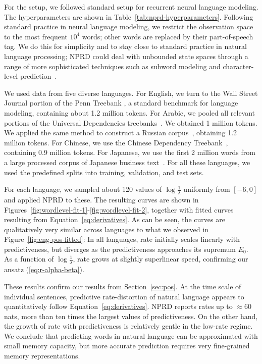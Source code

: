 \documentclass[entropy,article,submit,moreauthors,pdftex,10pt,a4paper]{Definitions/mdpi}
\begin{document}
For the setup, we followed standard setup for recurrent neural language modeling.
The hyperparameters are shown in Table~\ref{tab:nprd-hyperparameters}.
Following standard practice in neural language modeling, we restrict the observation space to the most frequent $10^4$ words; other words are replaced by their part-of-speech tag.
We do this for simplicity and to stay close to standard practice in natural language processing; NPRD could deal with unbounded state spaces through a range of more sophisticated techniques such as subword modeling and character-level prediction~\citep{kim2016character,luong2016achieving}.


We used data from five diverse languages.
For English, we turn to the Wall Street Journal portion of the Penn Treebank \citep{marcus-building-1993}, a standard benchmark for language modeling, containing about 1.2 million tokens.
For Arabic, we pooled all relevant portions of the Universal Dependencies treebanks~\citep{nivre-universal-2016,maamouri2004penn,hajic2004prague}. We obtained 1 million tokens.
We applied the same method to construct a Russian corpus~\citep{syntagrus}, obtaining 1.2 million tokens.
For Chinese, we use the Chinese Dependency Treebank~\citep{che2012chinese}, containing 0.9 million tokens.
For Japanese, we use the first 2 million words from a large processed corpus of Japanese business text~\citep{graff1995japanese}.
For all these languages, we used the predefined splits into training, validation, and test sets.

For each language, we sampled about 120 values of $\log \frac{1}{\lambda}$ uniformly from $[-6, 0]$ and applied NPRD to these.
The resulting curves are shown in Figures~\ref{fig:wordlevel-fit-1}-\ref{fig:wordlevel-fit-2}, together with fitted curves resulting from Equation~\ref{eq:derivatives}.
As can be seen, the curves are qualitatively very similar across languages to what we observed in Figure~\ref{fig:eng-pos-fitted}:
In all languages, rate initially scales linearly with predictiveness, but diverges as the predictiveness approaches its supremum $E_0$.
As a function of $\log \frac{1}{\lambda}$, rate grows at slightly superlinear speed, confirming our ansatz (\ref{eq:r-alpha-beta}).

These results confirm our results from Section~\ref{sec:pos}.
At the time scale of individual sentences, predictive rate-distortion of natural language appears to quantitatively follow Equation~\ref{eq:derivatives}.
NPRD reports rates up to $\approx 60$ nats, more than ten times the largest values of predictiveness.
On the other hand, the growth of rate with predictiveness is relatively gentle in the low-rate regime.
We conclude that predicting words in natural language can be approximated with small memory capacity, but more accurate prediction requires very fine-grained memory representations.
\end{document}
